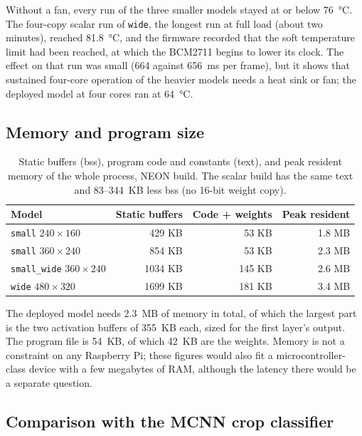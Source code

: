 \documentclass[11pt,a4paper]{article}
\newcommand{\cfg}[1]{\texttt{#1}}
\begin{document}
Without a fan, every run of the three smaller models stayed at or below
\SI{76}{\celsius}. The four-copy scalar run of \cfg{wide}, the longest run
at full load (about two minutes), reached \SI{81.8}{\celsius}, and the
firmware recorded that the soft temperature limit had been reached, at which
the BCM2711 begins to lower its clock. The effect on that run was small (664
against 656~ms per frame), but it shows that sustained four-core operation
of the heavier models needs a heat sink or fan; the deployed model at four
cores ran at \SI{64}{\celsius}.

\subsection{Memory and program size}

\begin{table}[h]
\centering
\caption{Static buffers (bss), program code and constants (text), and peak
resident memory of the whole process, NEON build. The scalar build has the
same text and 83--344~KB less bss (no 16-bit weight copy).}
\label{tab:memory}
\begin{tabular}{lrrr}
\toprule
Model & Static buffers & Code + weights & Peak resident \\
\midrule
\cfg{small} $240 \times 160$ & 429 KB & 53 KB & 1.8 MB \\
\cfg{small} $360 \times 240$ & 854 KB & 53 KB & 2.3 MB \\
\cfg{small\_wide} $360 \times 240$ & 1034 KB & 145 KB & 2.6 MB \\
\cfg{wide} $480 \times 320$ & 1699 KB & 181 KB & 3.4 MB \\
\bottomrule
\end{tabular}
\end{table}

The deployed model needs \SI{2.3}{MB} of memory in total, of which the
largest part is the two activation buffers of \SI{355}{KB} each, sized for
the first layer's output. The program file is \SI{54}{KB}, of which \SI{42}{KB}
are the weights. Memory is not a constraint on any Raspberry Pi; these
figures would also fit a microcontroller-class device with a few megabytes
of RAM, although the latency there would be a separate question.

\subsection{Comparison with the MCNN crop classifier}
\end{document}
